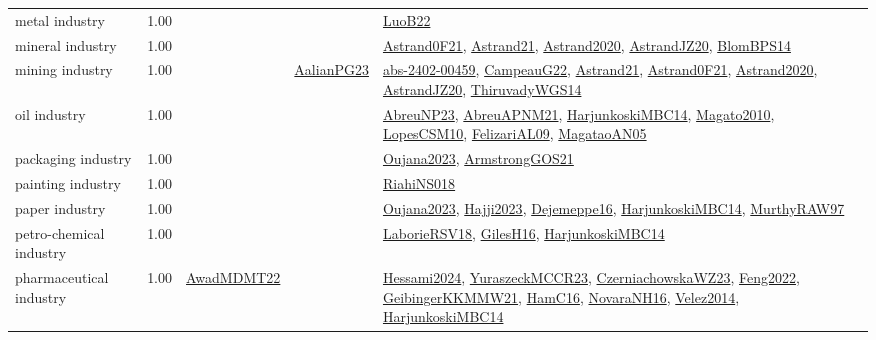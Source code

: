 {\begin{longtable}{p{3cm}r>{\raggedright\arraybackslash}p{6cm}>{\raggedright\arraybackslash}p{6cm}>{\raggedright\arraybackslash}p{8cm}}
\index{metal industry}\index{Industries!metal industry}metal industry &  1.00 &  &  & \hyperref[detail:LuoB22]{LuoB22}\\
\index{mineral industry}\index{Industries!mineral industry}mineral industry &  1.00 &  &  & \hyperref[detail:Astrand0F21]{Astrand0F21}, \hyperref[detail:Astrand21]{Astrand21}, \hyperref[detail:Astrand2020]{Astrand2020}, \hyperref[detail:AstrandJZ20]{AstrandJZ20}, \hyperref[detail:BlomBPS14]{BlomBPS14}\\
\index{mining industry}\index{Industries!mining industry}mining industry &  1.00 &  & \hyperref[detail:AalianPG23]{AalianPG23} & \hyperref[detail:abs-2402-00459]{abs-2402-00459}, \hyperref[detail:CampeauG22]{CampeauG22}, \hyperref[detail:Astrand21]{Astrand21}, \hyperref[detail:Astrand0F21]{Astrand0F21}, \hyperref[detail:Astrand2020]{Astrand2020}, \hyperref[detail:AstrandJZ20]{AstrandJZ20}, \hyperref[detail:ThiruvadyWGS14]{ThiruvadyWGS14}\\
\index{oil industry}\index{Industries!oil industry}oil industry &  1.00 &  &  & \hyperref[detail:AbreuNP23]{AbreuNP23}, \hyperref[detail:AbreuAPNM21]{AbreuAPNM21}, \hyperref[detail:HarjunkoskiMBC14]{HarjunkoskiMBC14}, \hyperref[detail:Magato2010]{Magato2010}, \hyperref[detail:LopesCSM10]{LopesCSM10}, \hyperref[detail:FelizariAL09]{FelizariAL09}, \hyperref[detail:MagataoAN05]{MagataoAN05}\\
\index{packaging industry}\index{Industries!packaging industry}packaging industry &  1.00 &  &  & \hyperref[detail:Oujana2023]{Oujana2023}, \hyperref[detail:ArmstrongGOS21]{ArmstrongGOS21}\\
\index{painting industry}\index{Industries!painting industry}painting industry &  1.00 &  &  & \hyperref[detail:RiahiNS018]{RiahiNS018}\\
\index{paper industry}\index{Industries!paper industry}paper industry &  1.00 &  &  & \hyperref[detail:Oujana2023]{Oujana2023}, \hyperref[detail:Hajji2023]{Hajji2023}, \hyperref[detail:Dejemeppe16]{Dejemeppe16}, \hyperref[detail:HarjunkoskiMBC14]{HarjunkoskiMBC14}, \hyperref[detail:MurthyRAW97]{MurthyRAW97}\\
\index{petro-chemical industry}\index{Industries!petro-chemical industry}petro-chemical industry &  1.00 &  &  & \hyperref[detail:LaborieRSV18]{LaborieRSV18}, \hyperref[detail:GilesH16]{GilesH16}, \hyperref[detail:HarjunkoskiMBC14]{HarjunkoskiMBC14}\\
\index{pharmaceutical industry}\index{Industries!pharmaceutical industry}pharmaceutical industry &  1.00 & \hyperref[detail:AwadMDMT22]{AwadMDMT22} &  & \hyperref[detail:Hessami2024]{Hessami2024}, \hyperref[detail:YuraszeckMCCR23]{YuraszeckMCCR23}, \hyperref[detail:CzerniachowskaWZ23]{CzerniachowskaWZ23}, \hyperref[detail:Feng2022]{Feng2022}, \hyperref[detail:GeibingerKKMMW21]{GeibingerKKMMW21}, \hyperref[detail:HamC16]{HamC16}, \hyperref[detail:NovaraNH16]{NovaraNH16}, \hyperref[detail:Velez2014]{Velez2014}, \hyperref[detail:HarjunkoskiMBC14]{HarjunkoskiMBC14}\\

\end{longtable}}
